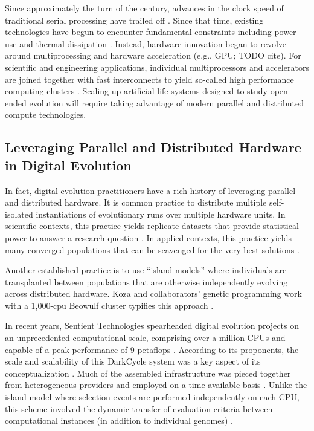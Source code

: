 Since approximately the turn of the century, advances in the clock speed of traditional serial processing have trailed off \citep{sutter2005free}.
Since that time, existing technologies have begun to encounter fundamental constraints including power use and thermal dissipation \citep{markov2014limits}.
Instead, hardware innovation began to revolve around multiprocessing  \citep[p.55]{hennessy2011computer} and hardware acceleration (e.g., GPU; TODO cite).
For scientific and engineering applications, individual multiprocessors and accelerators are joined together with fast interconnects to yield so-called high performance computing clusters \citep[p.436]{hennessy2011computer}.
Scaling up artificial life systems designed to study open-ended evolution will require taking advantage of modern parallel and distributed compute technologies.

\subsection{Leveraging Parallel and Distributed Hardware in Digital Evolution}

In fact, digital evolution practitioners have a rich history of leveraging parallel and distributed hardware.
It is common practice to distribute multiple self-isolated instantiations of evolutionary runs over multiple hardware units.
In scientific contexts, this practice yields replicate datasets that provide statistical power to answer a research question \citep{dolson2017spatial}.
In applied contexts, this practice yields many converged populations that can be scavenged for the very best solutions \citep{hornby2006automated}.

Another established practice is to use ``island models'' where individuals are transplanted between populations that are otherwise independently evolving across distributed hardware.
Koza and collaborators' genetic programming work with a 1,000-cpu Beowulf cluster typifies this approach \citep{bennett1999building}.

In recent years, Sentient Technologies spearheaded digital evolution projects on an unprecedented computational scale, comprising over a million CPUs and capable of a peak performance of 9 petaflops \citep{miikkulainen2019evolving}.
According to its proponents, the scale and scalability of this DarkCycle system was a key aspect of its conceptualization \citep{gilbert_2015}.
Much of the assembled infrastructure was pieced together from heterogeneous providers and employed on a time-available basis \citep{blondeau2012distributed}.
Unlike the island model where selection events are performed independently on each CPU, this scheme involved the dynamic transfer of evaluation criteria between computational instances (in addition to individual genomes) \citep{hodjat2013distributed}.


